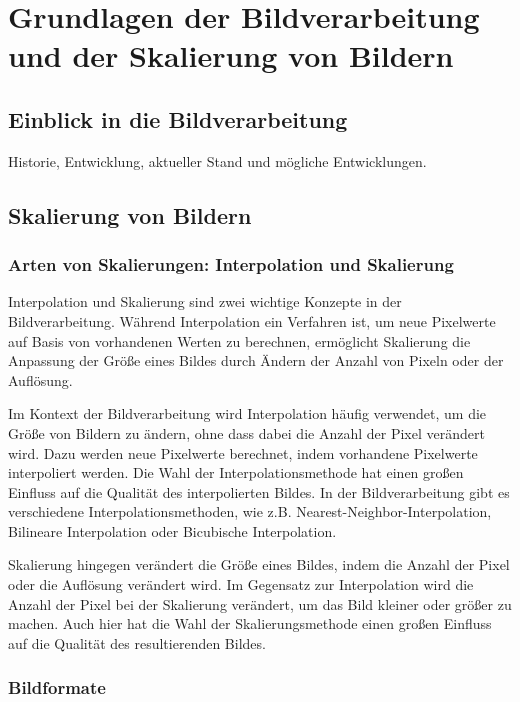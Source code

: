 



\chapter{Grundlagen der Bildverarbeitung und der Skalierung von Bildern}


\section{Einblick in die Bildverarbeitung}
Historie, Entwicklung, aktueller Stand und mögliche Entwicklungen.

\section{Skalierung von Bildern}

\subsection{Arten von Skalierungen: Interpolation und Skalierung}
Interpolation und Skalierung sind zwei wichtige Konzepte in der Bildverarbeitung. Während Interpolation ein Verfahren ist, um neue Pixelwerte auf Basis von vorhandenen Werten zu berechnen, ermöglicht Skalierung die Anpassung der Größe eines Bildes durch Ändern der Anzahl von Pixeln oder der Auflösung.

Im Kontext der Bildverarbeitung wird Interpolation häufig verwendet, um die Größe von Bildern zu ändern, ohne dass dabei die Anzahl der Pixel verändert wird. Dazu werden neue Pixelwerte berechnet, indem vorhandene Pixelwerte interpoliert werden. Die Wahl der Interpolationsmethode hat einen großen Einfluss auf die Qualität des interpolierten Bildes. In der Bildverarbeitung gibt es verschiedene Interpolationsmethoden, wie z.B. Nearest-Neighbor-Interpolation, Bilineare Interpolation oder Bicubische Interpolation.

Skalierung hingegen verändert die Größe eines Bildes, indem die Anzahl der Pixel oder die Auflösung verändert wird. Im Gegensatz zur Interpolation wird die Anzahl der Pixel bei der Skalierung verändert, um das Bild kleiner oder größer zu machen. Auch hier hat die Wahl der Skalierungsmethode einen großen Einfluss auf die Qualität des resultierenden Bildes.


\subsection{Bildformate}
